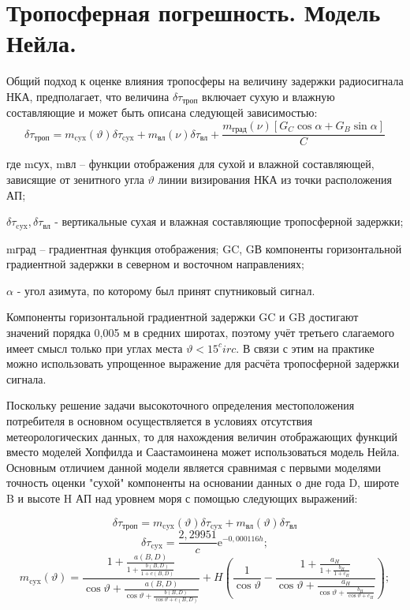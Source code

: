 \documentclass[14pt,a4paper,oneside]{extarticle}
\begin{document}
\section{Тропосферная погрешность. Модель Нейла.}

Общий подход к оценке влияния тропосферы на величину задержки радиосигнала НКА, предполагает, что величина $\delta\tau_\text{троп}$ включает сухую и влажную составляющие и может быть описана следующей зависимостью:
\[\delta\tau_{\text{троп}}=m_{\text{cyx}}(\vartheta)\delta\tau_{\text{cyx}}+m_{\text{вл}}(\nu)\delta\tau_{\text{вл}}+\frac{m_{\text{град}}(\nu)[G_C\cos\alpha+G_B\sin\alpha]}C\]

где mсух, mвл – функции отображения для сухой и влажной составляющей,
зависящие от зенитного угла $\vartheta$ линии визирования НКА из точки расположения АП;

$\delta\tau_{\text{cyx}},{\delta\tau}_{\text{вл}}$ - вертикальные сухая и влажная составляющие тропосферной задержки;

mград – градиентная функция отображения; GC, GВ компоненты горизонтальной градиентной задержки в северном и восточном направлениях; 

$\alpha$ - угол азимута, по которому был принят спутниковый сигнал.

Компоненты горизонтальной градиентной задержки GC и GB достигают значений порядка 0,005 м в средних широтах, поэтому учёт третьего слагаемого имеет смысл только при углах места $\vartheta < 15^circ$. В связи с этим на практике можно использовать упрощенное выражение для расчёта тропосферной задержки сигнала.

Поскольку решение задачи высокоточного определения местоположения потребителя в основном осуществляется в условиях отсутствия метеорологических данных, то для нахождения величин отображающих функций вместо моделей Хопфилда и Саастамоинена может использоваться модель Нейла. Основным отличием данной модели является сравнимая с первыми моделями точность оценки "сухой" компоненты на основании данных о дне года D, широте B и высоте H АП над уровнем моря с помощью следующих выражений:

\[\delta\tau_{\text{троп}}=m_{\text{cyx}}(\vartheta)\delta\tau_{\text{cyx}}+m_{\text{вл}}(\vartheta)\delta\tau_{\text{вл}}\]
\[\delta\tau_{\text{cyx}}=\frac{2,29951}{c}\mathrm{e}^{-0,000116h};\]
\[m_{\mathrm{cyx}}(\vartheta)=\frac{1+\frac{a(B,D)}{1+\frac{b(B,D)}{1+c(B,D)}}}{\cos\vartheta+\frac{a(B,D)}{\cos\vartheta+\frac{b(B,D)}{\cos\vartheta+c(B,D)}}}+H\left(\frac{1}{\cos\vartheta}-\frac{1+\frac{a_{H}}{1+\frac{b_{H}}{1+c_{H}}}}{\cos\vartheta+\frac{a_{H}}{\cos\vartheta+\frac{b_{H}}{\cos\vartheta+c_{H}}}}\right);\]
\end{document}
